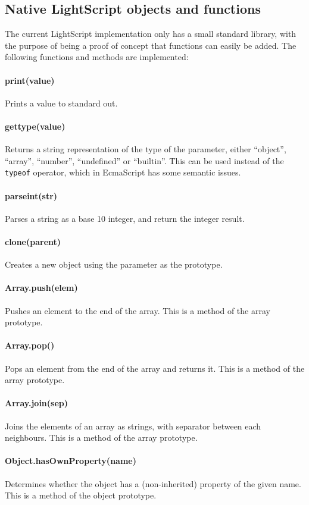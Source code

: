 \documentclass[11pt]{report}
\begin{document}
\subsection{Native LightScript objects and functions}
The current LightScript implementation only has a small standard library, with the purpose of being a proof of concept that functions can easily be added. The following functions and methods are implemented:

\paragraph{print(value)} Prints a value to standard out.
\paragraph{gettype(value)} Returns a string representation of the type of the parameter, either ``object'', ``array'', ``number'', ``undefined'' or ``builtin''. This can be used instead of the \verb|typeof| operator, which in EcmaScript has some semantic issues.
\paragraph{parseint(str)} Parses a string as a base 10 integer, and return the integer result.
\paragraph{clone(parent)} Creates a new object using the parameter as the prototype.
\paragraph{Array.push(elem)} Pushes an element to the end of the array. This is a method of the array prototype.
\paragraph{Array.pop()} Pops an element from the end of the array and returns it. This is a method of the array prototype.
\paragraph{Array.join(sep)} Joins the elements of an array as strings, with separator between each neighbours. This is a method of the array prototype.
\paragraph{Object.hasOwnProperty(name)} Determines whether the object has a (non-inherited) property of the given name. This is a method of the object prototype.
\end{document}
